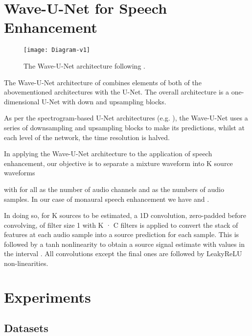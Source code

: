\documentclass{article}
\begin{document}
\section{Wave-U-Net for Speech Enhancement}\label{sec:wave-u-net}






\begin{figure}
    \centering
    \texttt{[image: Diagram-v1]}
    \caption{The Wave-U-Net architecture following \citep{Stoller2018Wave-U-Net:Separation}.}
    \label{fig:arch}
\end{figure}

The Wave-U-Net architecture of \citep{Stoller2018Wave-U-Net:Separation} combines elements of both of the abovementioned architectures with the U-Net. 
The overall architecture is a one-dimensional U-Net with down and upsampling blocks.

As per the spectrogram-based U-Net architectures (e.g. \citep{Jansson-et-al-2017-Sining}), the  Wave-U-Net uses a series of downsampling and upsampling blocks to make its predictions, whilst at each level of the network, the time resolution is halved. 




In applying the Wave-U-Net architecture to the application of speech enhancement, our objective is to separate a mixture waveform  into K source waveforms

with  for all  
as the number of audio channels and  as the numbers of audio samples. 
In our case of monaural speech enhancement we have  and .

In doing so, for K sources to be estimated, a 1D convolution, zero-padded before convolving, of filter size 1 with K · C filters is applied to convert the stack of features at each audio sample into a source prediction for each sample. This is followed by a tanh nonlinearity to obtain a source signal estimate with values in the interval . All convolutions except the final ones are followed by LeakyReLU non-linearities.

\section{Experiments} \label{sec:experiments}

\subsection{Datasets}
\end{document}
